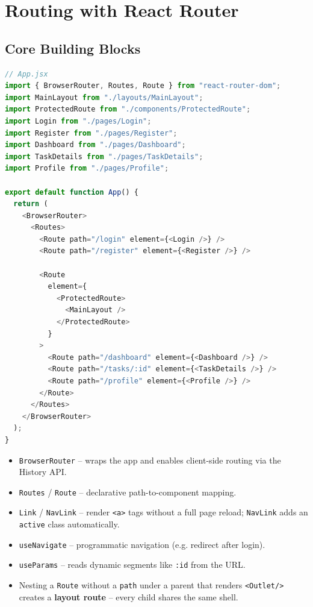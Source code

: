 \chapter{Routing with React Router}

\section{Core Building Blocks}

\begin{lstlisting}[language=JavaScript]
// App.jsx
import { BrowserRouter, Routes, Route } from "react-router-dom";
import MainLayout from "./layouts/MainLayout";
import ProtectedRoute from "./components/ProtectedRoute";
import Login from "./pages/Login";
import Register from "./pages/Register";
import Dashboard from "./pages/Dashboard";
import TaskDetails from "./pages/TaskDetails";
import Profile from "./pages/Profile";

export default function App() {
  return (
    <BrowserRouter>
      <Routes>
        <Route path="/login" element={<Login />} />
        <Route path="/register" element={<Register />} />

        <Route
          element={
            <ProtectedRoute>
              <MainLayout />
            </ProtectedRoute>
          }
        >
          <Route path="/dashboard" element={<Dashboard />} />
          <Route path="/tasks/:id" element={<TaskDetails />} />
          <Route path="/profile" element={<Profile />} />
        </Route>
      </Routes>
    </BrowserRouter>
  );
}
\end{lstlisting}

\begin{itemize}
  \item \texttt{BrowserRouter} -- wraps the app and enables client-side routing via the History API.
  \item \texttt{Routes} / \texttt{Route} -- declarative path-to-component mapping.
  \item \texttt{Link} / \texttt{NavLink} -- render \texttt{<a>} tags without a full page reload; \texttt{NavLink} adds an \texttt{active} class automatically.
  \item \texttt{useNavigate} -- programmatic navigation (e.g. redirect after login).
  \item \texttt{useParams} -- reads dynamic segments like \texttt{:id} from the URL.
  \item Nesting a \texttt{Route} without a \texttt{path} under a parent that renders \texttt{<Outlet/>} creates a \textbf{layout route} -- every child shares the same shell.
\end{itemize}

